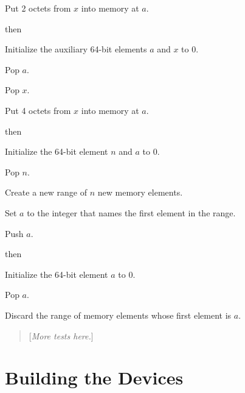 \documentclass[a4paper,12pt]{article}
\newcommand{\num}[1]{\texttt{#1}\xspace}
\newcommand{\hex}[1]{\num{#1}$_{\textup{\tiny\hskip-1ex 16}}$\xspace}
\newcommand{\comment}[1]{\begin{quote}[\textit{#1}]\end{quote}}
\newcommand{\op}[1]{#1}
\newcommand{\STOREI}    [1]{\op{\hex{16}}}
\newcommand{\ALLOCATE}  [1]{\op{\hex{18}}}
\newcommand{\DEALLOCATE}[1]{\op{\hex{19}}}
\begin{document}
\begin{stepnumbers}[start=3]
\begin{description}
\begin{stepnumbers}
    \item Put 2 octets from $x$ into memory at $a$.
    \end{stepnumbers}
  \item[\STOREI{}] then
    \begin{stepnumbers}
    \item Initialize the auxiliary 64-bit elements $a$ and $x$ to 0.
    \item Pop $a$.
    \item Pop $x$.
    \item Put 4 octets from $x$ into memory at $a$.
    \end{stepnumbers}
  \item[\ALLOCATE{}] then
    \begin{stepnumbers}
    \item Initialize the 64-bit element $n$ and $a$ to 0.
    \item Pop $n$.
    \item Create a new range of $n$ new memory elements.
    \item Set $a$ to the integer that names the first element in the range.
    \item Push $a$.
    \end{stepnumbers}
  \item[\DEALLOCATE{}] then
    \begin{stepnumbers}
    \item Initialize the 64-bit element $a$ to 0.
    \item Pop $a$.
    \item Discard the range of memory elements whose first element is $a$.
    \end{stepnumbers}
  \end{description}
\end{stepnumbers}

\comment{More tests here.}

\section{Building the Devices}
\label{sec:building-devices}
\end{document}

